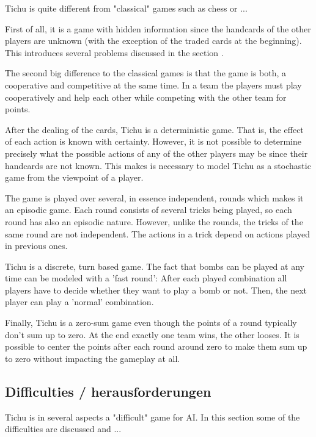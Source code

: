 Tichu is quite different from "classical" games such as chess or ... %

First of all, it is a game with hidden information since the handcards of the other players are unknown (with the exception of the traded cards at the beginning). This introduces several problems discussed in the section \textit{}.

The second big difference to the classical games is that the game is both, a cooperative and competitive at the same time. In a team the players must play cooperatively and help each other while competing with the other team for points.

After the dealing of the cards, Tichu is a deterministic game. That is, the effect of each action is known with certainty. However, it is not possible to determine precisely what the possible actions of any of the other players may be since their handcards are not known. This makes is necessary to model Tichu as a stochastic game from the viewpoint of a player.

The game is played over several, in essence independent, rounds which makes it an episodic game. Each round consists of several tricks being played, so each round has also an episodic nature. However, unlike the rounds, the tricks of the same round are not independent. The actions in a trick depend on actions played in previous ones. %

Tichu is a discrete, turn based game. The fact that bombs can be played at any time can be modeled with a 'fast round': After each played combination all players have to decide whether they want to play a bomb or not. Then, the next player can play a 'normal' combination. %

Finally, Tichu is a zero-sum game even though the points of a round typically don't sum up to zero. At the end exactly one team wins, the other looses. It is possible to center the points after each round around zero to make them sum up to zero without impacting the gameplay at all.

\subsection{Difficulties / herausforderungen}
 Tichu is in several aspects a "difficult" game for AI.
 In this section some of the difficulties are discussed and ... %

